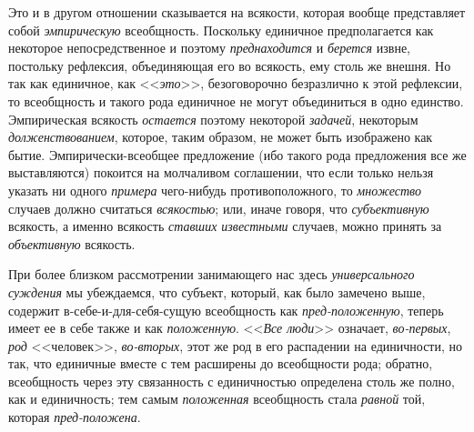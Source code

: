 {\label{bkm:bm38a}Это и в другом отношении сказывается на
всякости, которая вообще представляет собой
{\em эмпирическую}
всеобщность. Поскольку единичное предполагается как некоторое
непосредственное и поэтому
{\em преднаходится} и
{\em берется} извне,
постольку рефлексия, объединяющая его во всякость, ему столь же внешня. Но
так как единичное, как <<{\em это}>>,
безоговорочно безразлично к этой рефлексии, то всеобщность и
такого рода единичное не могут объединиться в одно единство. Эмпирическая
всякость {\em остается}
поэтому некоторой
{\em задачей}, некоторым
{\em долженствованием},
которое, таким образом, не может быть изображено как бытие.
Эмпирически-всеобщее предложение (ибо такого рода предложения все же
выставляются) покоится на молчаливом соглашении, что если только нельзя
указать ни одного {\em примера}
чего-нибудь противоположного, то
{\em множество} случаев
должно считаться {\em всякостью};
или, иначе говоря, что
{\em субъективную}
всякость, а именно всякость
{\em ставших известными}
случаев, можно принять за
{\em объективную}
всякость.

При более близком рассмотрении занимающего нас здесь
{\em универсального суждения}
мы убеждаемся, что субъект, который, как было замечено выше,
содержит в-себе-и-для-себя-сущую всеобщность как
{\em пред-положенную},
теперь имеет ее в себе также и как
{\em положенную}.
<<{\em Все люди}>> означает,
{\em во-первых},
{\em род} <<человек>>,
{\em во-вторых}, этот же
род в его распадении на единичности, но так, что единичные вместе с тем
расширены до всеобщности рода; обратно, всеобщность через эту связанность с
единичностью определена столь же полно, как и единичность; тем самым
{\em положенная}
всеобщность стала
{\em равной} той, которая
{\em пред-положена}.

}
